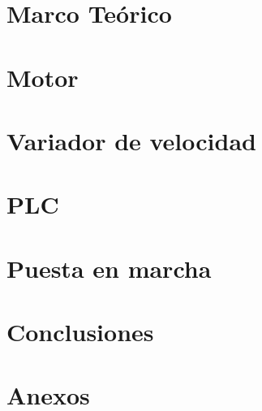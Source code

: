 \documentclass[12pt,a4paper]{article}
\begin{document}
\section{Marco Teórico}


\section{Motor}


\section{Variador de velocidad}

	
\section{PLC}

	


\section{Puesta en marcha}





\section{Conclusiones}


\section{Anexos}

\end{document}
